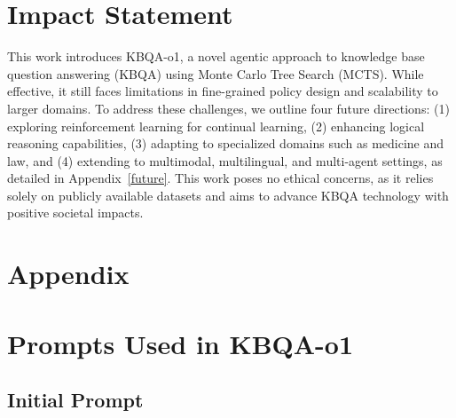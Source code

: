 \documentclass{article}
\theoremstyle{plain}
\theoremstyle{definition}
\theoremstyle{remark}
\begin{document}
\section*{Impact Statement}
This work introduces KBQA-o1, a novel agentic approach to knowledge base question answering (KBQA) using Monte Carlo Tree Search (MCTS). While effective, it still faces limitations in fine-grained policy design and scalability to larger domains. To address these challenges, we outline four future directions: (1) exploring reinforcement learning for continual learning, (2) enhancing logical reasoning capabilities, (3) adapting to specialized domains such as medicine and law, and (4) extending to multimodal, multilingual, and multi-agent settings, as detailed in Appendix~\ref{future}. This work poses no ethical concerns, as it relies solely on publicly available datasets and aims to advance KBQA technology with positive societal impacts.


\nocite{langley00}





\newpage
\appendix
\onecolumn
\section*{Appendix} 

\section{Prompts Used in KBQA-o1}
\subsection{Initial Prompt}
\label{prompt1}
\end{document}
